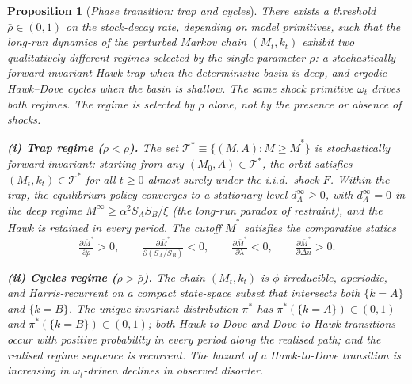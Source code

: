\documentclass[11pt,twoside]{extarticle}
\newtheorem{proposition}{Proposition}
\begin{document}
\begin{proposition}[\emph{Phase transition: trap and cycles}]\label{prop:phase_v3}
\emph{There exists a threshold $\bar\rho\in(0,1)$ on the stock-decay rate, depending on model primitives, such that the long-run dynamics of the perturbed Markov chain $(M_t,k_t)$ exhibit two qualitatively different regimes selected by the single parameter $\rho$: a stochastically forward-invariant Hawk trap when the deterministic basin is deep, and ergodic Hawk--Dove cycles when the basin is shallow. The same shock primitive $\omega_t$ drives both regimes. The regime is selected by $\rho$ alone, not by the presence or absence of shocks.}

\medskip
\noindent\textbf{(i) Trap regime ($\rho<\bar\rho$).} The set $\mathcal T^*\equiv\{(M,A):M\ge\bar M^*\}$ is stochastically forward-invariant: starting from any $(M_0,A)\in\mathcal T^*$, the orbit satisfies $(M_t,k_t)\in\mathcal T^*$ for all $t\ge 0$ almost surely under the i.i.d.\ shock $F$. Within the trap, the equilibrium policy converges to a stationary level $d_A^\infty\ge 0$, with $d_A^\infty=0$ in the deep regime $M^\infty\ge\alpha^2 S_A S_B/\xi$ (the long-run paradox of restraint), and the Hawk is retained in every period. The cutoff $\bar M^*$ satisfies the comparative statics
\begin{equation}\label{eq:cs_signs_v3}
    \tfrac{\partial\bar M^*}{\partial\rho}>0,\qquad\tfrac{\partial\bar M^*}{\partial(S_A/S_B)}<0,\qquad\tfrac{\partial\bar M^*}{\partial\lambda}<0,\qquad\tfrac{\partial\bar M^*}{\partial\Delta u}>0.
\end{equation}

\medskip
\noindent\textbf{(ii) Cycles regime ($\rho>\bar\rho$).} The chain $(M_t,k_t)$ is $\phi$-irreducible, aperiodic, and Harris-recurrent on a compact state-space subset that intersects both $\{k=A\}$ and $\{k=B\}$. The unique invariant distribution $\pi^*$ has $\pi^*(\{k=A\})\in(0,1)$ and $\pi^*(\{k=B\})\in(0,1)$; both Hawk-to-Dove and Dove-to-Hawk transitions occur with positive probability in every period along the realised path; and the realised regime sequence is recurrent. The hazard of a Hawk-to-Dove transition is increasing in $\omega_t$-driven declines in observed disorder.
\end{proposition}
\end{document}
